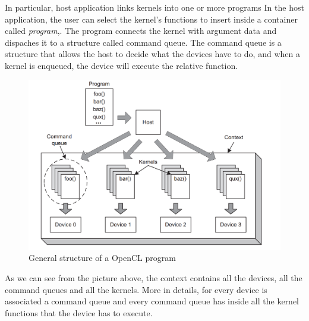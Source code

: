 In particular, host application links kernels into one or more programs In the host application, the
user can select the kernel's functions to insert inside a container
called \emph{program},.  The program connects the kernel with argument
data and dispaches it to a structure called command queue.  The
command queue is a structure that allows the host to decide what the
devices have to do, and when a kernel is enqueued, the device will
execute the relative function.

\begin{figure}[htp]
  \begin{center}
    \includegraphics[width=12cm]{./images/OpenCAL-CL/kernelDistribution}
    \caption{General structure of a OpenCL program}
    \label{fig:GeneralStructure}
  \end{center}
\end{figure}

As we can see from the picture above, the context contains all the devices, all the command queues and all the kernels.
More in details, for every device is associated a command queue and every command queue has inside all the kernel functions
that the device has to execute.

